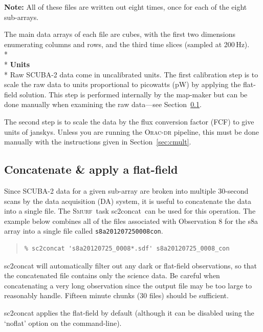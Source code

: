 \documentclass[twoside,11pt]{article}
\newcommand{\htmlref}[2]{#1}
\newcommand{\latexhtml}[2]{#1}
\newcommand{\xref}[3]{#1}
\newcommand{\xlabel}[1]{}
\renewcommand{\_}{\texttt{\symbol{95}}}
\newenvironment{myquote}{\begin{quote}\begin{small}}{\end{small}\end{quote}}
\newcommand{\smurf}{\xref{\textsc{Smurf}}{sun258}{}}
\newcommand{\task}[1]{\textsf{#1}}
\newcommand{\concat}{\xref{\task{sc2concat}}{sun258}{SC2CONCAT}}
\newcommand{\cref}[3]{\latexhtml{#1~\ref{#2}}{\htmlref{#3}{#2}}}
\begin{document}
\textbf{Note:} All of these files are written out eight times, once for each of
the eight sub-arrays.

The main data arrays of each file are cubes, with the first two
dimensions enumerating columns and rows, and the third time slices
(sampled at 200\,Hz).
\\*\\*
\textbf{Units}\\*
Raw SCUBA-2 data come in uncalibrated units. The first calibration
step is to scale the raw data to units proportional to picowatts (pW)
by applying the flat-field solution. This step is performed internally
 by the map-maker but can be done manually when examining the raw data---see
\cref{Section}{sec:concat}{Concatenate \& apply a flat-field}.

The second step is to scale the data by the flux conversion factor
(FCF) to give units of janskys. Unless you are running the
\textsc{Orac-dr} pipeline, this must be done manually with the
instructions given in \cref{Section}{sec:cmult}{Applying the FCF and
determining fluxes}.


\subsection{\xlabel{concat}Concatenate \& apply a flat-field}
\label{sec:concat}

Since SCUBA-2 data for a given sub-array are broken into multiple
30-second scans by the data acquisition (DA) system, it is useful to
concatenate the data into a single file. The \smurf\ task \concat\ can
be used for this operation. The example below combines all of the
files associated with Observation 8 for the s8a array into a single
file called \texttt{s8a20120725\_0008\_con}.

\begin{myquote}
\begin{verbatim}
% sc2concat 's8a20120725_0008*.sdf' s8a20120725_0008_con
\end{verbatim}
\end{myquote}
\task{sc2concat} will automatically filter out any dark or flat-field
observations, so that the concatenated file contains only the science
data. Be careful when concatenating a very long observation since the
output file may be too large to reasonably handle. Fifteen minute
chunks (30 files) should be sufficient.

\task{sc2concat} applies the flat-field by default (although it can be
disabled using the `noflat' option on the command-line).
\end{document}
